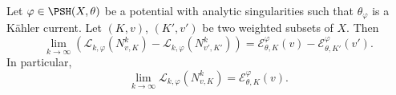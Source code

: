 \begin{proposition}\label{prop:quant_I_algebraic_BM} Let $\varphi\in \PSH(X,\theta)$ be a potential with analytic singularities such that $\theta_{\varphi}$ is a Kähler current. Let $(K,v)$, $(K',v')$ be two weighted subsets of $X$.
Then
\begin{equation}\label{eq:LkdiffconvtoI}
\lim_{k\to\infty} \left( \mathcal{L}_{k,\varphi}(N^k_{v,K}) - \mathcal{L}_{k,\varphi}(N^k_{v',K'}) \right) = \mathcal{E}_{\theta,K}^{\varphi}(v)-\mathcal{E}_{\theta,K'}^{\varphi}(v').
\end{equation}
In particular,
\begin{equation}\label{eq:Lkconv}
\lim_{k\to\infty}\mathcal{L}_{k,\varphi}(N^k_{v,K})=\mathcal{E}_{\theta,K}^{\varphi}(v).
\end{equation}
\end{proposition}

